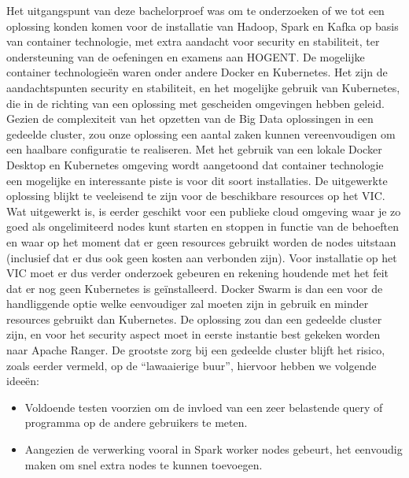 Het uitgangspunt van deze bachelorproef was om te onderzoeken of we tot een oplossing konden komen voor de installatie van Hadoop, Spark en Kafka op basis van container technologie, met extra aandacht voor security en stabiliteit, ter ondersteuning van de oefeningen en examens aan HOGENT.
\newline
De mogelijke container technologieën waren onder andere Docker en Kubernetes.
\newline
\newline
Het zijn de aandachtspunten security en stabiliteit, en het mogelijke gebruik van Kubernetes, die in de richting van een oplossing met gescheiden omgevingen hebben geleid. 
\newline
Gezien de complexiteit van het opzetten van de Big Data oplossingen in een gedeelde cluster, zou onze oplossing een aantal zaken kunnen
vereenvoudigen om een haalbare configuratie te realiseren.
\newline
\newline
Met het gebruik van een lokale Docker Desktop en Kubernetes omgeving wordt aangetoond dat container technologie een mogelijke en interessante piste is voor dit soort installaties.
\newline
De uitgewerkte oplossing blijkt te veeleisend te zijn voor de beschikbare resources op het VIC. Wat uitgewerkt is, is eerder geschikt voor een publieke cloud omgeving waar je zo goed als ongelimiteerd nodes kunt starten en stoppen in functie van de behoeften en waar op het moment dat er geen resources gebruikt worden de nodes uitstaan (inclusief dat er dus ook geen kosten aan verbonden zijn).
\newline
\newline
Voor installatie op het VIC moet er dus verder onderzoek gebeuren en rekening houdende met het feit dat er nog geen Kubernetes is geïnstalleerd. Docker Swarm is dan een voor de handliggende optie welke eenvoudiger zal moeten zijn in gebruik en minder resources gebruikt dan Kubernetes.
\newline
De oplossing zou dan een gedeelde cluster zijn, en voor het security aspect moet in eerste instantie best gekeken worden naar Apache Ranger.
\newline
De grootste zorg bij een gedeelde cluster blijft het risico, zoals eerder vermeld, op de ``lawaaierige buur'', hiervoor hebben we volgende ideeën:
\newline
\begin{itemize}
    \item Voldoende testen voorzien om de invloed van een zeer belastende query of programma op de andere gebruikers te meten.
    \item Aangezien de verwerking vooral in Spark worker nodes gebeurt, het eenvoudig maken om snel extra nodes te kunnen toevoegen.
\end{itemize}

